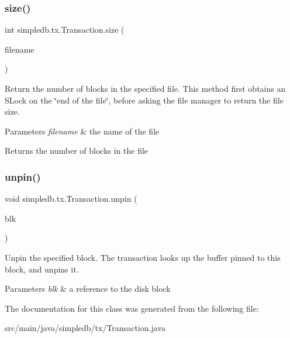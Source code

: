 \subsubsection{\texorpdfstring{size()}{size()}}
{\footnotesize\ttfamily int simpledb.\+tx.\+Transaction.\+size (\begin{DoxyParamCaption}\item[{String}]{filename }\end{DoxyParamCaption})\hspace{0.3cm}{\ttfamily [inline]}}

Return the number of blocks in the specified file. This method first obtains an S\+Lock on the \char`\"{}end of the file\char`\"{}, before asking the file manager to return the file size. 
\begin{DoxyParams}{Parameters}
{\em filename} & the name of the file \\
\hline
\end{DoxyParams}
\begin{DoxyReturn}{Returns}
the number of blocks in the file 
\end{DoxyReturn}
\mbox{\label{classsimpledb_1_1tx_1_1Transaction_a42fe8eafb8392377f70bf747cb219dbb}} 
\subsubsection{\texorpdfstring{unpin()}{unpin()}}
{\footnotesize\ttfamily void simpledb.\+tx.\+Transaction.\+unpin (\begin{DoxyParamCaption}\item[{\hyperlink{classsimpledb_1_1file_1_1BlockId}{Block\+Id}}]{blk }\end{DoxyParamCaption})\hspace{0.3cm}{\ttfamily [inline]}}

Unpin the specified block. The transaction looks up the buffer pinned to this block, and unpins it. 
\begin{DoxyParams}{Parameters}
{\em blk} & a reference to the disk block \\
\hline
\end{DoxyParams}


The documentation for this class was generated from the following file\+:\begin{DoxyCompactItemize}
\item 
src/main/java/simpledb/tx/Transaction.\+java\end{DoxyCompactItemize}
